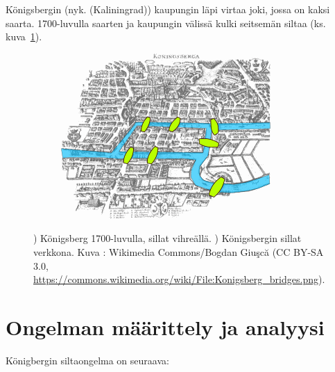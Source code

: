 Königsbergin (nyk. \kaliningrad (Kaliningrad)) kaupungin läpi virtaa joki, jossa on kaksi saarta. 1700-luvulla saarten ja kaupungin välissä kulki seitsemän siltaa (ks. kuva~\ref{fig:konigsberg:map}). 

\begin{figure}
  \centering
  \begin{subfigure}{.45\linewidth}
    \includegraphics[width=\linewidth]{konigsberg_bridges}
    \caption{}\label{fig:konigsberg:map}
  \end{subfigure}
  \begin{subfigure}{.45\linewidth}
    \centering
    
    \caption{}\label{fig:konigsberg:tikz}
  \end{subfigure}
  \caption[Königsberg 1700-luvulla]{) Königsberg 1700-luvulla, sillat vihreällä. ) Königsbergin sillat verkkona. Kuva : Wikimedia Commons/Bogdan Giuşcă (CC BY-SA 3.0, \url{https://commons.wikimedia.org/wiki/File:Konigsberg_bridges.png}).}
  \label{fig:konigsberg}
\end{figure}

\section{Ongelman määrittely ja analyysi}
\label{sec:konigsberg_def}

Königbergin siltaongelma on seuraava:

